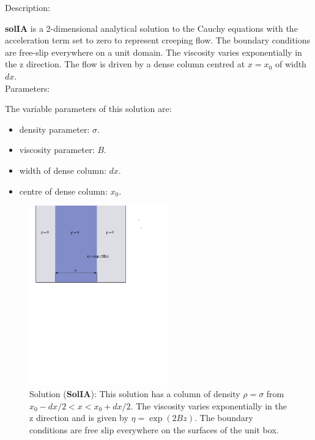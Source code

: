   {\large \fontB Description:}
  
  {\bf solIA} is a 2-dimensional analytical solution to the Cauchy equations with the acceleration term set to zero
  to represent creeping flow. The boundary conditions are free-slip everywhere on a unit domain.  The viscosity varies exponentially in the z direction.
  The flow is driven by a dense column centred at $ x=x_0 $ of width $dx$.
  \\

 {\large \fontB Parameters:}
  
 The variable parameters of this solution are:
 \begin{itemize}
   \item{density parameter: $ \sigma $.}
   \item{viscosity parameter: $B$.}
   \item{width of dense column: $dx$.}
   \item{centre of dense column: $x_0$.}

 \end{itemize}

  \begin{figure}
    \includegraphics[width=6cm,clip]{../figs/figIA.pdf}
    \caption[Short caption]{\label{figIA} 
      Solution ({\bf SolIA}):
      This solution has a column of density $\rho = \sigma$ from $x_0-dx/2 < x < x_0+dx/2$.
      The viscosity varies exponentially in the z direction and is given by
      $\eta = \exp (2 B z)$.
      The boundary conditions are free slip everywhere on the surfaces of the unit box.}
  \end{figure} 
  

